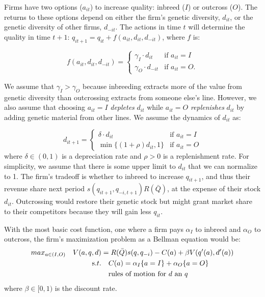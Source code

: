 \documentclass[12pt,letterpaper]{article}
\begin{document}
Firms have two options ($a_{it}$) to increase quality: inbreed ($I$) or outcross ($O$). The returns to these options depend on either the firm's genetic diversity, $d_{it}$, or the genetic diversity of other firms, $d_{-it}$. The actions in time $t$ will determine the quality in time $t+1$: $q_{it+1} = q_{it} + f(a_{it},d_{it},d_{-it})$, where $f$ is:

$$f(a_{it},d_{it},d_{-it}) = \begin{cases}
\gamma_I \cdot d_{it} & \text{if } a_{it} = I \\
\gamma_O \cdot d_{-it} & \text{if } a_{it} = O.
\end{cases}$$

We assume that $\gamma_I>\gamma_O$ because inbreeding extracts more of the value from genetic diversity than outcrossing extracts from someone else's line. However, we also assume that choosing $a_{it}=I$ \textit{depletes} $d_{it}$ while $a_{it}=O$ \textit{replenishes} $d_{it}$ by adding genetic material from other lines.
We assume the dynamics of $d_{it}$ as:

$$d_{it+1} = \begin{cases}
\delta \cdot d_{it} & \text{if } a_{it} = I \\
\min\{(1+\rho)d_{it}, 1\} & \text{if } a_{it} = O
\end{cases}$$
where $\delta \in (0,1)$ is a depreciation rate and $\rho >0$ is a replenishment rate. For simplicity, we assume that there is some upper limit to $d_{it}$ that we can normalize to 1. The firm's tradeoff is whether to inbreed to increase $q_{it+1}$, and thus their revenue share next period $s(q_{it+1},q_{-i,t+1}) R(\bar{Q})$, at the expense of their stock $d_{it}$. Outcrossing would restore their genetic stock but might grant market share to their competitors because they will gain less $q_{it}$.

With the most basic cost function, one where a firm pays $\alpha_I$ to inbreed and $\alpha_O$ to outcross, the firm's maximization problem as a Bellman equation would be:
\begin{align*}
max_{a \in (I,O)} \quad  V(a,q,d) &= R(\bar{Q}) s(q,q_{-i}) -C(a) + \beta V(q'(a),d'(a)) \\
\text s.t.&\quad  C(a) = \alpha_I \{a=I\} + \alpha_O \{a=O\}\\
          &\quad \text{rules of motion for $d$ an $q$}\\
          \end{align*}
where $\beta \in [0,1)$ is the discount rate.
\end{document}
